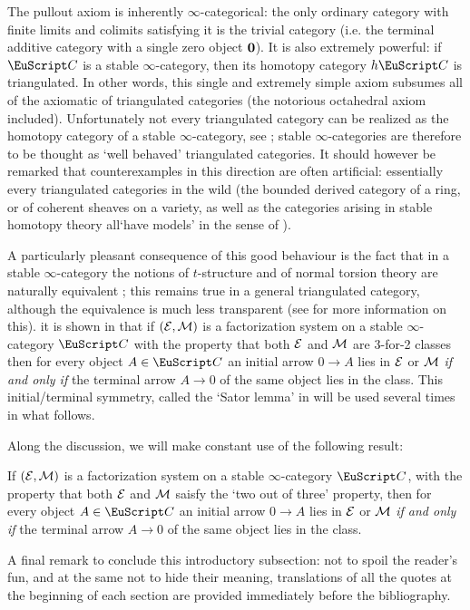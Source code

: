 {The pullout axiom is inherently $\infty$-categorical: the only ordinary category with finite limits and colimits satisfying it is the trivial category (i.e. the terminal additive category with a single zero object $\bf 0$). It is also extremely powerful: if $\C$ is a stable $\infty$-category, then its homotopy category $h\C$ is triangulated. In other words, this single and extremely simple axiom subsumes all of the axiomatic of triangulated categories (the notorious octahedral axiom included). Unfortunately not every triangulated category can be realized as the homotopy category of a stable $\infty$-category, see \cite{MR2342636}; stable $\infty$-categories are therefore to be thought as `well behaved' triangulated categories. It should however be remarked that counterexamples in this direction are often artificial: essentially every triangulated categories in the wild (the bounded derived category of a ring, or of coherent sheaves on a variety, as well as the categories arising in stable homotopy theory all`have models'  in the sense of \cite{MR2342636}). 

A particularly pleasant consequence of this good behaviour is the fact that in a stable $\infty$-category the notions of $t$-structure and of normal torsion theory are naturally equivalent \cite{Fiorenza2014}; this remains true in a general triangulated category, although the equivalence is much less transparent (see \cite{tderiv} for more information on this).  it is shown in \cite{Fiorenza2014} that if $(\mathcal{E},\mathcal{M})$ is a factorization system on a stable $\infty$-category $\C$ with the property that both $\mathcal{E}$ and $\mathcal{M}$ are 3-for-2 classes then for every object $A\in\C$ an initial arrow $0\to A$ lies in $\mathcal{E}$ or $\mathcal{M}$ \emph{if and only if} the terminal arrow $A\to 0$ of the same object lies in the class. This initial/terminal symmetry, called the `Sator lemma' in \cite{Fiorenza2014} will be used several times in what follows.

Along the discussion, we will make constant use of the following result:%
\begin{lemma*}
If $(\mathcal{E},\mathcal{M})$ is a factorization system on a stable $\infty$-category $\C$, with the property that both $\mathcal{E}$ and $\mathcal{M}$ saisfy the `two out of three' property, then for every object $A\in\C$ an initial arrow $0\to A$ lies in $\mathcal{E}$ or $\mathcal{M}$ \emph{if and only if} the terminal arrow $A\to 0$ of the same object lies in the class.
\end{lemma*}
A final remark to conclude this introductory subsection: not to spoil the reader's fun, and at the same not to hide their meaning, translations of all the quotes at the beginning of each section are provided immediately before the bibliography.
}